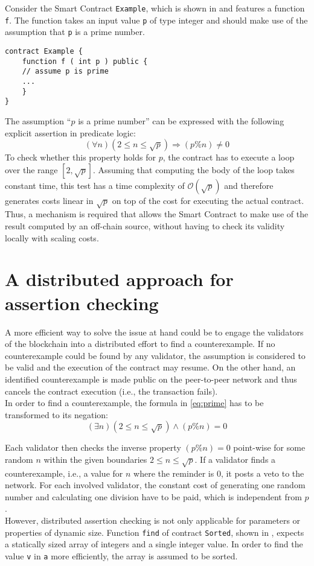 Consider the Smart Contract \texttt{Example}, which is shown in  and features a function \texttt{f}. The function takes an input value \texttt{p} of type integer and should make use of the assumption that \texttt{p} is a prime number.
\begin{lstlisting}[caption=Smart contract with a function expecting a prime number \cite{thiemann_2020}, numbers=none, language=Solidity, label=lst:prime]
contract Example {
	function f ( int p ) public {
	// assume p is prime
	...
	}
}
\end{lstlisting}
The assumption ``$p$ is a prime number'' can be expressed with the following explicit assertion in predicate logic: 
\begin{equation}\label{eq:prime}
    (\forall n) (2 \le n \le \sqrt{p}) \Rightarrow (p \% n) \neq 0
\end{equation}
To check whether this property holds for $p$, the contract has to execute a loop over the range $[2, \sqrt{p}]$. Assuming that computing the body of the loop takes constant time, this test has a time complexity of $\mathcal{O}(\sqrt{p})$ and therefore generates costs linear in $\sqrt{p}$ on top of the cost for executing the actual contract. Thus, a mechanism is required that allows the Smart Contract to make use of the result computed by an off-chain source, without having to check its validity locally with scaling costs.

\section{A distributed approach for assertion checking}
A more efficient way to solve the issue at hand could be to engage the validators of the blockchain into a distributed effort to find a counterexample. If no counterexample could be found by any validator, the assumption is considered to be valid and the execution of the contract may resume. On the other hand, an identified counterexample is made public on the peer-to-peer network and thus cancels the contract execution (i.e., the transaction fails). \\
In order to find a counterexample, the formula in \eqref{eq:prime} has to be transformed to its negation:
\begin{equation}\label{eq:prime_neg}
	(\exists n) (2 \le n \le \sqrt{p}) \wedge (p \% n) = 0
\end{equation}

Each validator then checks the inverse property $(p \% n) = 0$ point-wise for some random $n$ within the given boundaries $2 \le n \le \sqrt{p}$. If a validator finds a counterexample, i.e., a value for $n$ where the reminder is $0$, it posts a veto to the network. For each involved validator, the constant cost of generating one random number and calculating one division have to be paid, which is independent from $p$. \\
However, distributed assertion checking is not only applicable for parameters or properties of dynamic size. Function \texttt{find} of contract \texttt{Sorted}, shown in , expects a statically sized array of integers and a single integer value. In order to find the value \texttt{v} in \texttt{a} more efficiently, the array is assumed to be sorted. 

